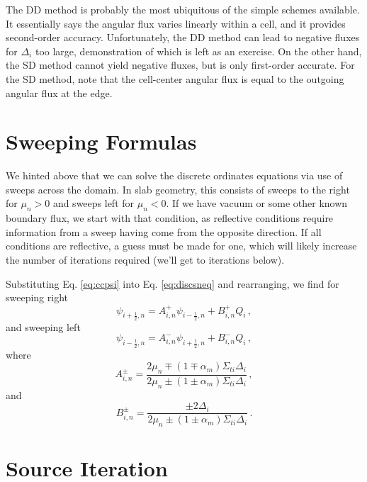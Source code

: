 The DD method is probably the most ubiquitous of the simple schemes available.  It essentially says the angular flux varies linearly within a cell, and it provides second-order accuracy.  Unfortunately, the DD method can lead to negative fluxes for $\Delta_i$ too large, demonstration of which is left as an exercise.  On the other hand, the SD method cannot yield negative fluxes, but is only first-order accurate.  For the SD method, note that the cell-center angular flux is equal to the outgoing angular flux at the edge.

\section*{Sweeping Formulas}

We hinted above that we can solve the discrete ordinates equations via use of sweeps across the domain.  In slab geometry, this consists of sweeps to the right for $\mu_n > 0$ and sweeps left for $\mu_n < 0$.  If we have vacuum or some other known boundary flux, we start with that condition, as reflective conditions require information from a sweep having come from the opposite direction.  If all conditions are reflective, a guess must be made for one, which will likely increase the number of iterations required (we'll get to iterations below).

Substituting Eq. \ref{eq:ccpsi} into Eq. \ref{eq:discsneq} and rearranging, we find for sweeping right
\begin{equation}
 \psi_{i+\frac{1}{2},n} = A^+_{i,n} \psi_{i-\frac{1}{2},n} + B^+_{i,n} Q_i \, ,
 \label{eq:rightsweep}
\end{equation}
and sweeping left
\begin{equation}
 \psi_{i-\frac{1}{2},n} = A^-_{i,n} \psi_{i+\frac{1}{2},n} + B^-_{i,n} Q_i \, , 
 \label{eq:leftsweep}
\end{equation}
where
\begin{equation}
 A^{\pm}_{i,n} = \frac{2\mu_n \mp (1 \mp \alpha_m)\Sigma_{ti}\Delta_i}{2\mu_n \pm (1 \pm \alpha_m)\Sigma_{ti}\Delta_i} \, , 
 \label{eq:Aconstant}
\end{equation}
and
\begin{equation}
 B^{\pm}_{i,n} = \frac{\pm 2 \Delta_i}{2\mu_n \pm (1 \pm \alpha_m)\Sigma_{ti}\Delta_i} \, .
 \label{eq:Bconstant}
\end{equation}

\section*{Source Iteration}

